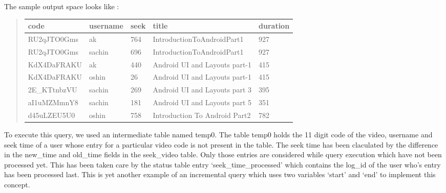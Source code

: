 \documentclass[a4paper,12pt,oneside]{sphinxmanual}
\begin{document}
The sample output space looks like :
\begin{quote}

\begin{tabulary}{\linewidth}{|L|L|L|L|L|}
\hline
\textsf{\relax 
code
} & \textsf{\relax 
username
} & \textsf{\relax 
seek
} & \textsf{\relax 
title
} & \textsf{\relax 
duration
}\\
\hline
RU2qJTO0Gms
 & 
ak
 & 
764
 & 
IntroductionToAndroidPart1
 & 
927
\\

RU2qJTO0Gms
 & 
sachin
 & 
696
 & 
IntroductionToAndroidPart1
 & 
927
\\

KdX4DaFRAKU
 & 
ak
 & 
440
 & 
Android UI and Layouts part-1
 & 
415
\\

KdX4DaFRAKU
 & 
oshin
 & 
26
 & 
Android UI and Layouts part-1
 & 
415
\\

2E\_KTtnbzVU
 & 
sachin
 & 
269
 & 
Android UI and Layouts part 3
 & 
395
\\

aI1uMZMmnY8
 & 
sachin
 & 
181
 & 
Android UI and Layouts part 5
 & 
351
\\

d45uLZEU5U0
 & 
oshin
 & 
758
 & 
Introduction To Android Part2
 & 
782
\\
\hline\end{tabulary}

\end{quote}

To execute this query, we used an intermediate table named temp0. The table temp0 holds the 11 digit code of the video, username and seek time of a user whose entry for a particular video code is not present in the table. The seek time has been claculated by the difference in the new\_time and old\_time fields in the seek\_video table. Only those entries are considered while query execution which have not been processed yet. This has been taken care by the status table entry `seek\_time\_processed' which contains the log\_id of the user who's entry has been processed last. This is yet another example of an incremental query which uses two variables `start' and `end' to implement this concept.
\end{document}
